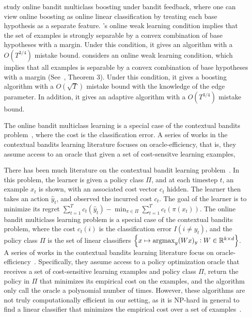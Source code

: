 \cite{Chen-Lin-Lu-2014, Zhang-Jung-Tewari-2018} study online bandit multiclass
boosting under bandit feedback, where one can view online boosting as online
linear classification by treating each base hypothesis as a separate feature.
\cite{Chen-Lin-Lu-2014}'s online weak learning condition implies that
the set of examples is strongly separable by a convex combination of base hypotheses
with a margin. Under this condition, it gives an algorithm with a $O(T^{3/4})$
mistake bound. \cite{Zhang-Jung-Tewari-2018} considers an online weak learning
condition, which implies that all examples is separable by a convex combination of base hypotheses with a margin (See~\cite{Mukherjee-Schapire-2013}, Theorem 3).
Under this condition, it gives
a boosting algorithm with a $O(\sqrt{T})$ mistake bound with the knowledge of the edge
parameter. In addition, it gives an adaptive algorithm with a $O(T^{3/4})$
mistake bound.

The online bandit multiclass learning is a special case of the contextual bandits
problem~\cite{Auer-2003, Langford-Zhang-2008}, where the cost is the classification error.
A series of works in the contextual bandits learning literature focuses on
oracle-efficiency, that is, they assume access to an
oracle that given a set of cost-sensitve learning examples,

There has been much literature on the contextual bandit learning problem~\citep{Auer-2003, Langford-Zhang-2008}.
In this problem, the learner is given a policy class $\Pi$, and
at each timestep $t$, an example $x_t$ is shown, with an associated cost vector $c_t$ hidden.
The learner then takes an action $\hat{y}_t$, and observed the incurred cost $c_t$.
The goal of the learner is to minimize its regret $\sum_{t=1}^T c_t(\hat{y}_t) - \min_{\pi \in \Pi} \sum_{t=1}^T c_t(\pi(x_t))$.
The online bandit multiclass learning problem is a special case of the contextual bandits problem,
where the cost $c_t(i)$ is the classification error $I(i \neq y_t)$,
and the policy class $\Pi$ is the set of linear classifiers
$\cbr{x \mapsto \argmax_y (Wx)_y: W \in \R^{k \times d}}$.
A series of works in the contextual bandits learning literature focus on
oracle-efficiency~\citep{Dudik-Hsu-Kale-Karampatziakis-Langford-Reyzin-Zhang-2011,
Agarwal-Hsu-Kale-Langford-Li-Schapire-2014,
Rakhlin-Sridharan-2016,
Syrgkanis-Krishnamurthy-Schapire-2016,
Syrgkanis-Luo-Krishnamurthy-Schapire-2016}.
Specifically, they assume access to a policy optimization
oracle that receives a set of cost-sensitive learning examples and policy class $\Pi$,
return the policy in $\Pi$ that minimizes its empirical cost on the examples, and the algorithm
only call the oracle a polynomial number of times.
However, these algorithms are not truly computationally efficient in our setting,
as it is NP-hard in general to find a linear classifier that minimizes the empirical cost over a set of examples~\citep{Arora-Babai-Stern-Sweedyk-1997}.

